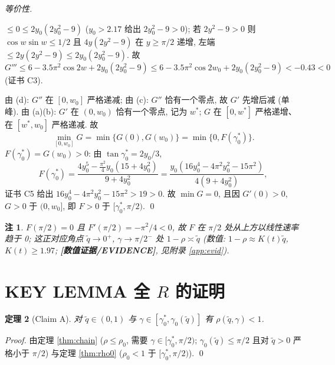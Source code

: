 \documentclass[UTF8]{ctexart}
\newtheorem{theorem}{定理}[section]
\newtheorem{remark}[theorem]{注}
\newcommand{\EVID}{\textbf{[数值证据/EVIDENCE]}}
\begin{document}
\begin{proof}[等价性]
\begin{enumerate}
		$\le0\le2y_0(2y_0^2-9)$ ($y_0>2.17$ 给出 $2y_0^2-9>0$); 若
		$2y^2-9>0$ 则 $\cos w\sin w\le1/2$ 且 $4y(2y^2-9)$ 在
		$y\ge\pi/2$ 递增, 左端 $\le2y(2y^2-9)\le2y_0(2y_0^2-9)$. 故
		\begin{equation}
			G'''\le6-3.5\pi^2\cos2w+2y_0(2y_0^2-9)
			\le6-3.5\pi^2\cos2w_0+2y_0(2y_0^2-9)
			<-0.43<0
			\label{eq:Gpppb}
		\end{equation}
		(证书 C3).
\end{enumerate}
由 (d): $G''$ 在 $[0,w_0]$ 严格递减; 由 (c): $G''$ 恰有一个零点, 故 $G'$
先增后减 (单峰). 由 (a)(b): $G'$ 在 $(0,w_0)$ 恰有一个零点, 记为 $w^*$;
$G$ 在 $[0,w^*]$ 严格递增、在 $[w^*,w_0]$ 严格递减. 故
\begin{equation}
	\min_{[0,w_0]}G=\min\{G(0),G(w_0)\}=\min\{0,F(\gamma_0^*)\}.
\end{equation}
$F(\gamma_0^*)=G(w_0)>0$: 由 $\tan\gamma_0^*=2y_0/3$,
\begin{equation}
	F(\gamma_0^*)=
	\frac{4y_0^5-\frac{\pi^2}{4}y_0(15+4y_0^2)}{9+4y_0^2}
	=\frac{y_0(16y_0^4-4\pi^2y_0^2-15\pi^2)}{4(9+4y_0^2)},
	\label{eq:F0}
\end{equation}
证书 C5 给出 $16y_0^4-4\pi^2y_0^2-15\pi^2>19>0$. 故 $\min G=0$, 且因
$G'(0)>0$, $G>0$ 于 $(0,w_0]$, 即 $F>0$ 于 $[\gamma_0^*,\pi/2)$. \qed
\end{proof}

\begin{remark}
$F(\pi/2)=0$ 且 $F'(\pi/2)=-\pi^2/4<0$, 故 $F$ 在 $\pi/2$ 处从上方以线性速率
趋于 0; 这正对应角点 $\tilde q\to0^+$, $\gamma\to\pi/2^-$ 处 $1-\rho\asymp\tilde q$
(数值: $1-\rho\approx K(t)\tilde q$, $K(t)\ge1.97$; \EVID{}, 见附录
\ref{app:evid}).
\end{remark}

\section{\texorpdfstring{KEY LEMMA 全 $R$ 的证明}{KEY LEMMA 全 R 的证明}}\label{sec:proof}

\begin{theorem}[Claim A]\label{thm:claimA}
对 $\tilde q\in(0,1)$ 与 $\gamma\in[\gamma_0^*,\gamma_0(\tilde q)]$ 有
$\rho(\tilde q,\gamma)<1$.
\end{theorem}

\begin{proof}
由定理 \ref{thm:chain} ($\rho\le\rho_0$, 需要
$\gamma\in[\gamma_0^*,\pi/2)$; $\gamma_0(\tilde q)\le\pi/2$ 且对 $\tilde q>0$ 严格小于 $\pi/2$) 与定理
\ref{thm:rho0} ($\rho_0<1$ 于 $[\gamma_0^*,\pi/2)$). \qed
\end{proof}
\end{document}
